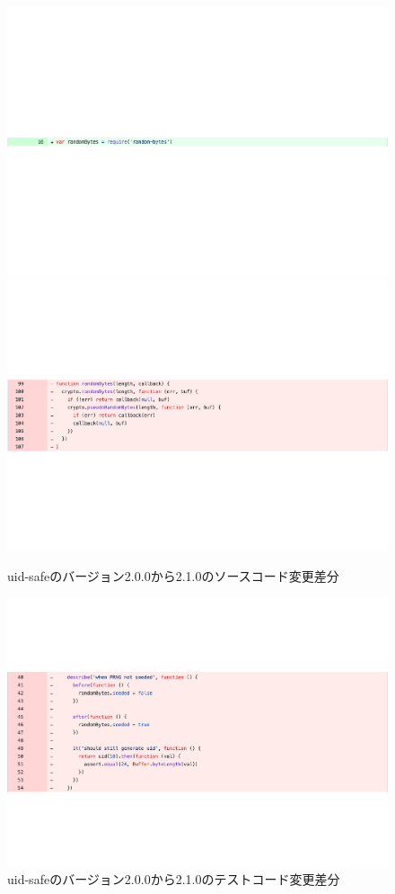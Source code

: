 \documentclass[11pt,dvipdfmx]{jreport}
\begin{document}
\begin{figure}[t]
  \centering
  \includegraphics[width=1.0\linewidth]{fig/rq1/uuid/randomBytes2.pdf}
  \includegraphics[width=1.0\linewidth]{fig/rq1/uuid/randomByte.pdf}
  \caption{uid-safeのバージョン2.0.0から2.1.0のソースコード変更差分}
  \label{fig:rq1.delete-test-src}
\end{figure}

\begin{figure}[t]
  \centering
  \includegraphics[width=1.0\linewidth]{fig/rq1/uuid/randomByte-test.pdf}
  \caption{uid-safeのバージョン2.0.0から2.1.0のテストコード変更差分}
  \label{fig:rq1.delete-test-test}
\end{figure}
\end{document}
